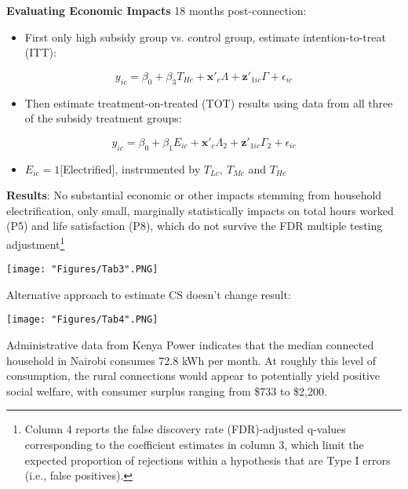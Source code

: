 \documentclass[compress]{beamer}
\begin{document}
\begin{frame}
\textbf{Evaluating Economic Impacts} 18 months post-connection: \vspace{2mm}
\begin{itemize}
\item First only high subsidy group vs. control group, estimate intention-to-treat (ITT):
\end{itemize}
\begin{equation}
y_{ic}=\beta_0+\beta_3T_{Hc}+\textbf{x}'_c\Lambda+\textbf{z}'_{1ic}\Gamma+\epsilon_{ic}
\end{equation}
\begin{itemize}
\item Then estimate treatment-on-treated (TOT) results using data from all three of the
subsidy treatment groups:
\end{itemize}
\begin{equation}
y_{ic}=\beta_0+\beta_1E_{ic}+\textbf{x}'_c\Lambda_2+\textbf{z}'_{1ic}\Gamma_2+\epsilon_{ic}
\end{equation}
\begin{itemize}
\item $E_{ic}=1[$Electrified], instrumented by $T_{Lc},\ T_{Mc}$ and $T_{Hc}$
\end{itemize}
 \vspace{2mm}
\textbf{Results}: No substantial economic or other impacts stemming from household electrification, only small, marginally statistically impacts on total hours worked (P5) and life satisfaction (P8), which do not survive the FDR multiple testing adjustment\footnote{\tiny Column 4 reports the false discovery rate (FDR)-adjusted q-values corresponding to
the coefficient estimates in column 3, which limit the expected proportion of rejections within a
hypothesis that are Type I errors (i.e., false positives).}

\end{frame}

\begin{frame} \centering
\texttt{[image: "Figures/Tab3".PNG]} 
\end{frame}

\begin{frame} 
Alternative approach to estimate CS doesn't change result: \\
\begin{center}
\texttt{[image: "Figures/Tab4".PNG]}  
\end{center}
Administrative data from Kenya Power indicates that the median connected
household in Nairobi consumes 72.8 kWh per month. At roughly this level of consumption, the rural connections would appear to potentially yield positive social welfare, with consumer surplus ranging from \$733 to \$2,200.
\end{frame}
\end{document}
